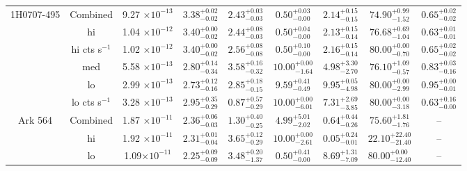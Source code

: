 \documentclass{article}
\begin{document}
\begin{landscape}
\begin{longtable}{ccccccccc}
\hline
1H0707-495 & Combined & 9.27 $\times 10^{-13}$ & $3.38^{+0.02}_{-0.02}$ &  $2.43^{+0.03}_{-0.03}$ & $0.50^{+0.03}_{-0.00}$ & $2.14^{+0.15}_{-0.15}$ & $74.90^{+0.99}_{-1.52}$ & $0.65^{+0.02}_{-0.02}$\\
& hi & 1.04 $\times 10^{-12}$ & $3.40^{+0.00}_{-0.02}$ & $2.44^{+0.08}_{-0.03}$ & $0.50^{+0.04}_{-0.00}$ & $2.13^{+0.15}_{-0.14}$ & $76.68^{+0.69}_{-1.04}$ & $0.63^{+0.01}_{-0.01}$\\
& hi cts s$^{-1}$ & 1.02 $\times 10^{-12}$ & $3.40^{+0.00}_{-0.02}$ & $2.56^{+0.08}_{-0.08}$ & $0.50^{+0.10}_{-0.00}$ & $2.16^{+0.15}_{-0.14}$ & $80.00^{+0.00}_{-0.70}$ & $0.65^{+0.02}_{-0.02}$\\
& med & 5.58 $\times 10^{-13}$ & $2.80^{+0.14}_{-0.34}$  & $3.58^{+0.16}_{-0.32}$ & $10.00^{+0.00}_{-1.64}$ & $4.98^{+3.30}_{-2.70}$ & $76.10^{+1.09}_{-0.57}$ & $0.83^{+0.03}_{-0.16}$\\
& lo & 2.99 $\times 10^{-13}$ & $2.73^{+0.12}_{-0.16}$ & $2.85^{+0.18}_{-0.15}$ & $9.59^{+0.41}_{-0.49}$ & $9.95^{+0.05}_{-4.98}$ & $80.00^{+0.00}_{-2.99}$ & $0.95^{+0.00}_{-0.01}$\\ 
& lo cts s$^{-1}$ & 3.28 $\times 10^{-13}$ & $2.95^{+0.35}_{-0.29}$ & $0.87^{+0.57}_{-0.29}$ & $10.00^{+0.00}_{-6.01}$ & $7.31^{+2.69}_{-3.85}$ & $80.00^{+0.00}_{-3.18}$ & $0.63^{+0.16}_{-0.00}$\\ \hline

Ark 564 & Combined & 1.87 $\times 10^{-11}$ & $2.36^{+0.06}_{-0.03}$ & $1.30^{+0.40}_{-0.25}$ & $4.99^{+5.01}_{-2.02}$ & $0.64^{+0.44}_{-0.26}$ & $75.60^{+1.81}_{-1.76}$ & -- \\ 
& hi & 1.92 $\times 10^{-11}$ & $2.31^{+0.01}_{-0.04}$  & $3.65^{+0.12}_{-0.29}$ & $10.00^{+0.00}_{-2.61}$ & $0.05^{+0.24}_{-0.01}$ & $22.10^{+22.40}_{-21.40}$ & -- \\
& lo & 1.09$\times 10^{-11}$ & $2.25^{+0.09}_{-0.09}$  & $3.48^{+0.20}_{-1.37}$ & $0.50^{+0.41}_{-0.00}$ & $8.69^{+1.31}_{-7.09}$ & $80.00^{+0.00}_{-12.40}$ & -- \\ \hline 


\end{longtable}
\end{landscape}
\end{document}
